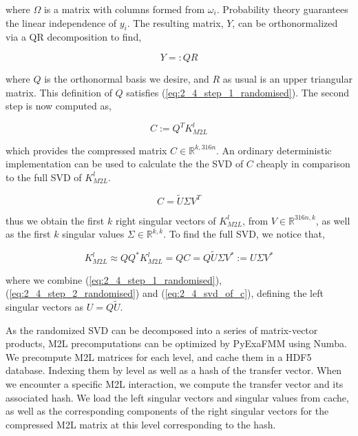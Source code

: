 \documentclass{IEEEcsmag}
\begin{document}
where $\Omega$ is a matrix with columns formed from $\omega_i$. Probability theory guarantees the linear independence of $y_i$. The resulting matrix, $Y$, can be orthonormalized via a QR decomposition to find,

\begin{equation}
    Y =: QR
\end{equation}

where $Q$ is the orthonormal basis we desire, and $R$ as usual is an upper triangular matrix. This definition of $Q$ satisfies (\ref{eq:2_4_step_1_randomised}). The second step is now computed as,

\begin{equation}
    C := Q^T K_{M2L}^l
    \label{eq:2_4_step_2_randomised}
\end{equation}

which provides the compressed matrix $C \in \mathbb{R}^{k, 316n}$.
An ordinary deterministic implementation can be used to calculate the the SVD of $C$ cheaply in comparison to the full SVD of $K_{M2L}^l$.

\begin{equation}
    C = \tilde{U}\Sigma V^T
    \label{eq:2_4_svd_of_c}
\end{equation}

thus we obtain the first $k$ right singular vectors of $K_{M2L}^l$, from $V \in \mathbb{R}^{316n, k}$, as well as the first $k$ singular values $\Sigma \in \mathbb{R}^{k, k}$. To find the full SVD, we notice that,

\begin{equation}
    K_{M2L}^l \approx Q Q^* K_{M2L}^l = QC = Q \tilde{U} \Sigma V^* := U\Sigma V^*
\end{equation}

where we combine (\ref{eq:2_4_step_1_randomised}), (\ref{eq:2_4_step_2_randomised}) and (\ref{eq:2_4_svd_of_c}), defining the left singular vectors as $U = Q \tilde{U}$.

As the randomized SVD can be decomposed into a series of matrix-vector products, M2L precomputations can be optimized by PyExaFMM using Numba. We precompute M2L matrices for each level, and cache them in a HDF5 database. Indexing them by level as well as a hash of the transfer vector. When we encounter a specific M2L interaction, we compute the transfer vector and its associated hash. We load the left singular vectors and singular values from cache, as well as the corresponding components of the right singular vectors for the compressed M2L matrix at this level corresponding to the hash.
\end{document}
